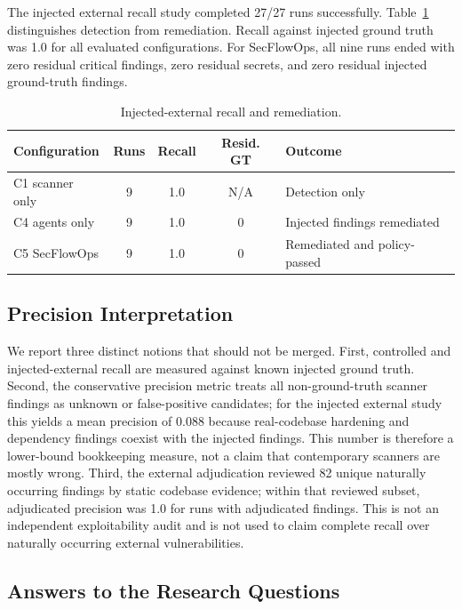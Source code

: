 The injected external recall study completed 27/27 runs successfully. Table~\ref{tab:injected-recall} distinguishes detection from remediation. Recall against injected ground truth was 1.0 for all evaluated configurations. For SecFlowOps, all nine runs ended with zero residual critical findings, zero residual secrets, and zero residual injected ground-truth findings.

\begin{table}[t]
\centering
\footnotesize
\caption{Injected-external recall and remediation.}
\label{tab:injected-recall}
\begin{tabular}{@{}lcccp{2.35cm}@{}}
\toprule
Configuration & Runs & Recall & Resid. GT & Outcome \\
\midrule
C1 scanner only & 9 & 1.0 & N/A & Detection only \\
C4 agents only & 9 & 1.0 & 0 & Injected findings remediated \\
C5 SecFlowOps & 9 & 1.0 & 0 & Remediated and policy-passed \\
\bottomrule
\end{tabular}
\end{table}

\subsection{Precision Interpretation}

We report three distinct notions that should not be merged. First, controlled and injected-external recall are measured against known injected ground truth. Second, the conservative precision metric treats all non-ground-truth scanner findings as unknown or false-positive candidates; for the injected external study this yields a mean precision of 0.088 because real-codebase hardening and dependency findings coexist with the injected findings. This number is therefore a lower-bound bookkeeping measure, not a claim that contemporary scanners are mostly wrong. Third, the external adjudication reviewed 82 unique naturally occurring findings by static codebase evidence; within that reviewed subset, adjudicated precision was 1.0 for runs with adjudicated findings. This is not an independent exploitability audit and is not used to claim complete recall over naturally occurring external vulnerabilities.

\subsection{Answers to the Research Questions}

